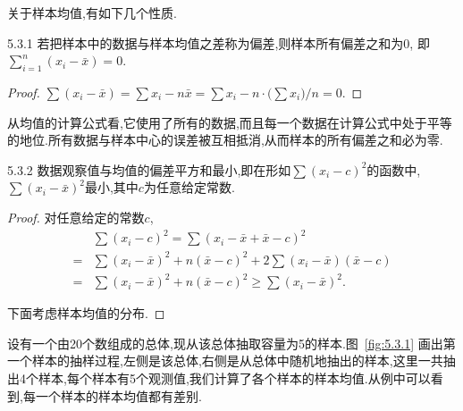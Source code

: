关于样本均值,有如下几个性质.
\begin{theorem}{}{5.3.1}
若把样本中的数据与样本均值之差称为偏差,则样本所有偏差之和为$0$, 即$\sum_{i=1}^n(x_i-\bar x)=0$.
\end{theorem}
\begin{proof}
$\sum(x_i-\bar x)=\sum x_i-n\bar x=\sum x_i-n\cdot\big(\sum x_i\big)/n=0$.
\end{proof}

从均值的计算公式看,它使用了所有的数据,而且每一个数据在计算公式中处于平等的地位.所有数据与样本中心的误差被互相抵消,从而样本的所有偏差之和必为零.
\begin{theorem}{}{5.3.2}
数据观察值与均值的偏差平方和最小,即在形如$\sum(x_i-c)^2$的函数中, $\sum(x_i-\bar x)^2$最小,其中$c$为任意给定常数.
\end{theorem}
\begin{proof}
对任意给定的常数$c$,
\begin{align*}
{}&\sum(x_i-c)^2=\sum(x_i-\bar x+\bar x-c)^2\\
=&\sum(x_i-\bar x)^2+n(\bar x-c)^2+
2\sum(x_i-\bar x)(\bar x-c)\\
=&\sum(x_i-\bar x)^2+n(\bar x-c)^2\geq\sum(x_i-\bar x)^2.
\end{align*}

下面考虑样本均值的分布.
\end{proof}
\begin{example}\label{exam:5.3.2}
设有一个由20个数组成的总体,现从该总体抽取容量为5的样本.图~\ref{fig:5.3.1} 画出第一个样本的抽样过程,左侧是该总体,右侧是从总体中随机地抽出的样本,这里一共抽出4个样本,每个样本有5个观测值,我们计算了各个样本的样本均值.从例中可以看到,每一个样本的样本均值都有差别.
\end{example}
